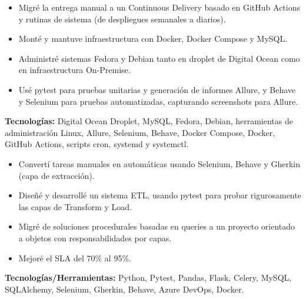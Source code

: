 \documentclass[10pt,a4paper]{altacv}
\begin{document}
\vspace{5mm}

\begin{itemize}
    \setlength{\itemindent}{0.5em}
    \item[--] Migré la entrega manual a un Continuous Delivery basado en GitHub Actions y rutinas de sistema (de despliegues semanales a diarios).
    \item[--] Monté y mantuve infraestructura con Docker, Docker Compose y MySQL.
    \item[--] Administré sistemas Fedora y Debian tanto en droplet de Digital Ocean como en infraestructura On-Premise.
    \item[--] Usé pytest para pruebas unitarias y generación de informes Allure, y Behave y Selenium para pruebas automatizadas, capturando screenshots para Allure.
\end{itemize}
\textbf{Tecnologías:} Digital Ocean Droplet, MySQL, Fedora, Debian, herramientas de administración Linux, Allure, Selenium, Behave, Docker Compose, Docker, GitHub Actions, scripts cron, systemd y systemctl.
\vspace{5mm}

\begin{itemize}
    \setlength{\itemindent}{0.5em}
    \item[--] Convertí tareas manuales en automáticas usando Selenium, Behave y Gherkin (capa de extracción).
    \item[--] Diseñé y desarrollé un sistema ETL, usando pytest para probar rigurosamente las capas de Transform y Load.
    \item[--] Migré de soluciones procedurales basadas en queries a un proyecto orientado a objetos con responsabilidades por capas.
    \item[--] Mejoré el SLA del 70\% al 95\%.
\end{itemize}
\textbf{Tecnologías/Herramientas:} Python, Pytest, Pandas, Flask, Celery, MySQL, SQLAlchemy, Selenium, Gherkin, Behave, Azure DevOps, Docker.
\vspace{5mm}


\break
{}
\end{document}
